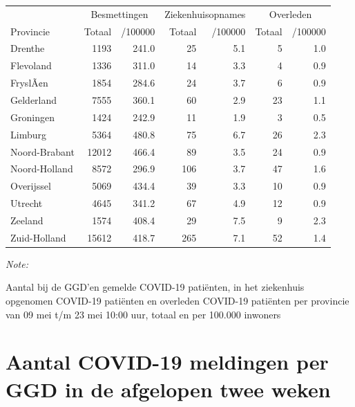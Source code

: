 \documentclass[
  english,
  man,floatsintext]{apa6}
\begin{document}
\begin{table}
\centering
\begin{threeparttable}
\begin{tabular}{lrrrrrr}
\toprule
\multicolumn{1}{c}{ } & \multicolumn{2}{c}{Besmettingen} & \multicolumn{2}{c}{Ziekenhuisopnames} & \multicolumn{2}{c}{Overleden} \\
\cmidrule(l{3pt}r{3pt}){2-3} \cmidrule(l{3pt}r{3pt}){4-5} \cmidrule(l{3pt}r{3pt}){6-7}
Provincie & Totaal & /100000 & Totaal & /100000 & Totaal & /100000\\
\midrule
Drenthe & 1193 & 241.0 & 25 & 5.1 & 5 & 1.0\\
Flevoland & 1336 & 311.0 & 14 & 3.3 & 4 & 0.9\\
FryslÃ¢n & 1854 & 284.6 & 24 & 3.7 & 6 & 0.9\\
Gelderland & 7555 & 360.1 & 60 & 2.9 & 23 & 1.1\\
Groningen & 1424 & 242.9 & 11 & 1.9 & 3 & 0.5\\
Limburg & 5364 & 480.8 & 75 & 6.7 & 26 & 2.3\\
Noord-Brabant & 12012 & 466.4 & 89 & 3.5 & 24 & 0.9\\
Noord-Holland & 8572 & 296.9 & 106 & 3.7 & 47 & 1.6\\
Overijssel & 5069 & 434.4 & 39 & 3.3 & 10 & 0.9\\
Utrecht & 4645 & 341.2 & 67 & 4.9 & 12 & 0.9\\
Zeeland & 1574 & 408.4 & 29 & 7.5 & 9 & 2.3\\
Zuid-Holland & 15612 & 418.7 & 265 & 7.1 & 52 & 1.4\\
\bottomrule
\end{tabular}
\begin{tablenotes}
\item \textit{Note: } 
\item Aantal bij de GGD’en gemelde COVID-19 patiënten, in het ziekenhuis opgenomen COVID-19 patiënten en overleden COVID-19 patiënten per provincie van 09 mei t/m 23 mei 10:00 uur, totaal en per 100.000 inwoners
\end{tablenotes}
\end{threeparttable}
\end{table}

\newpage

\hypertarget{aantal-covid-19-meldingen-per-ggd-in-de-afgelopen-twee-weken}{%
\section{Aantal COVID-19 meldingen per GGD in de afgelopen twee weken}\label{aantal-covid-19-meldingen-per-ggd-in-de-afgelopen-twee-weken}}
\end{document}
